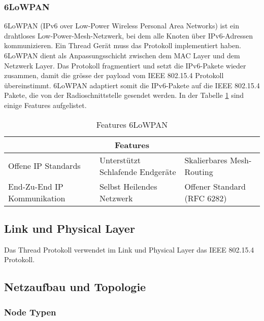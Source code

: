 \subsubsection{6LoWPAN}\label{subsubsec:6LoWPAN}
6LoWPAN (IPv6 over Low-Power Wireless Personal Area Networks) ist ein drahtloses Low-Power-Mesh-Netzwerk, bei dem alle Knoten über IPv6-Adressen kommunizieren. Ein Thread Gerät muss das Protokoll implementiert haben. 6LoWPAN dient als Anpassungsschicht zwischen dem MAC Layer und dem Netzwerk Layer. Das Protokoll fragmentiert und setzt die IPv6-Pakete wieder zusammen, damit die grösse der payload vom IEEE 802.15.4 Protokoll übereinstimmt. 6LoWPAN adaptiert somit die IPv6-Pakete auf die IEEE 802.15.4 Pakete, die von der Radioschnittstelle gesendet werden. \cite{thubert_compression_2011} In der Tabelle \ref{table:Features6LoWPAN} sind einige Features aufgelistet. \cite[Seite 3-10]{thread_group_inc_thread_2017}
\begin{table}[H]
	\centering
	\begin{adjustbox}{width=1\textwidth}
		\begin{tabular}{@{}|l|l|l|@{}}
			\toprule
			\multicolumn{3}{|c|}{\textbf{Features}}                                                      \\ \midrule
			Offene IP Standards         & Unterstützt Schlafende Endgeräte & Skalierbares Mesh-Routing   \\ \midrule
			End-Zu-End IP Kommunikation & Selbst Heilendes Netzwerk        & Offener Standard (RFC 6282) \\ \bottomrule
		\end{tabular}
	\end{adjustbox}
	\caption{Features 6LoWPAN}
	\label{table:Features6LoWPAN}
\end{table}

\subsection{Link und Physical Layer}\label{subsec:IEE802154}
Das Thread Protokoll verwendet im Link und Physical Layer das IEEE 802.15.4 Protokoll. \cite{ieee_computer_society_ieee_2020} \cite[Seite 3-2]{thread_group_inc_thread_2017}
\newpage

\subsection{Netzaufbau und Topologie}\label{subsec:NetzaufbauundTopologie}
\subsubsection{Node Typen}\label{subsubsec:NodeTypen}
